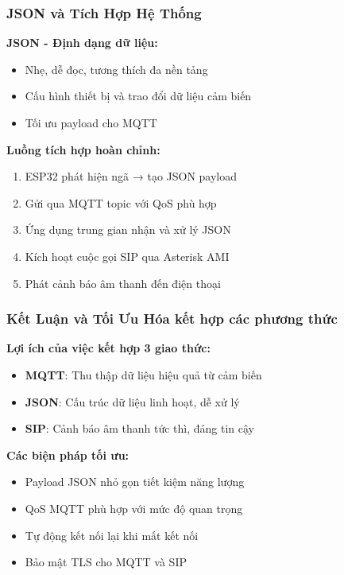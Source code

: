 \begin{frame}
\frametitle{JSON và Tích Hợp Hệ Thống}

\textbf{JSON - Định dạng dữ liệu:}
\begin{itemize}
\item Nhẹ, dễ đọc, tương thích đa nền tảng
\item Cấu hình thiết bị và trao đổi dữ liệu cảm biến
\item Tối ưu payload cho MQTT
\end{itemize}

\textbf{Luồng tích hợp hoàn chỉnh:}
\begin{enumerate}
\item ESP32 phát hiện ngã → tạo JSON payload
\item Gửi qua MQTT topic với QoS phù hợp  
\item Ứng dụng trung gian nhận và xử lý JSON
\item Kích hoạt cuộc gọi SIP qua Asterisk AMI
\item Phát cảnh báo âm thanh đến điện thoại
\end{enumerate}
\end{frame}

\begin{frame}
\frametitle{Kết Luận và Tối Ưu Hóa kết hợp các phương thức}

\textbf{Lợi ích của việc kết hợp 3 giao thức:}
\begin{itemize}
\item \textbf{MQTT}: Thu thập dữ liệu hiệu quả từ cảm biến
\item \textbf{JSON}: Cấu trúc dữ liệu linh hoạt, dễ xử lý
\item \textbf{SIP}: Cảnh báo âm thanh tức thì, đáng tin cậy
\end{itemize}

\textbf{Các biện pháp tối ưu:}
\begin{itemize}
\item Payload JSON nhỏ gọn tiết kiệm năng lượng
\item QoS MQTT phù hợp với mức độ quan trọng
\item Tự động kết nối lại khi mất kết nối
\item Bảo mật TLS cho MQTT và SIP
\end{itemize}

\end{frame}

